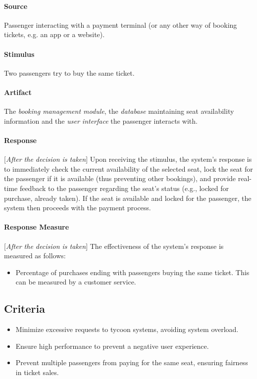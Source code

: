 \paragraph{Source} Passenger interacting with a payment terminal (or any other way of booking tickets, e.g. an app or a website).
\paragraph{Stimulus} Two passengers try to buy the same ticket.
\paragraph{Artifact} The \textit{booking management module}, the \textit{database} maintaining seat availability information and the \textit{user interface} the passenger interacts with.
\paragraph{Response}[\textit{After the decision is taken}] Upon receiving the stimulus, the system's response is to immediately check the current availability of the selected seat, lock the seat for the passenger if it is available (thus preventing other bookings), and provide real-time feedback to the passenger regarding the seat's status (e.g., locked for purchase, already taken). If the seat is available and locked for the passenger, the system then proceeds with the payment process.
\paragraph{Response Measure}[\textit{After the decision is taken}] The effectiveness of the system's response is measured as follows:
\begin{itemize}
    \item Percentage of purchases ending with passengers buying the same ticket. This can be measured by a customer service.
\end{itemize}

\subsection*{Criteria}
\begin{itemize}
    \item Minimize excessive requests to tycoon systems, avoiding system overload.
    \item Ensure high performance to prevent a negative user experience.
    \item Prevent multiple passengers from paying for the same seat, ensuring fairness in ticket sales.
\end{itemize}

